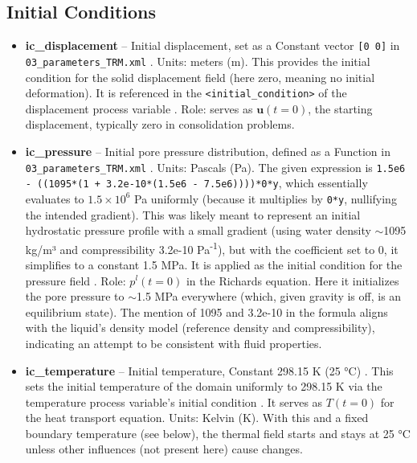 \documentclass[10pt,a4paper]{article}
\begin{document}
\subsection*{Initial Conditions}
\begin{itemize}
    \item \textbf{ic\_displacement} -- Initial displacement, set as a Constant vector \texttt{[0 0]} in \texttt{03\_parameters\_TRM.xml} \cite{file:03_parameters_TRM}. Units: meters (m). This provides the initial condition for the solid displacement field (here zero, meaning no initial deformation). It is referenced in the \texttt{<initial\_condition>} of the displacement process variable \cite{file:02_process_variables_TRM}. Role: serves as $\mathbf{u}(t=0)$, the starting displacement, typically zero in consolidation problems.

    \item \textbf{ic\_pressure} -- Initial pore pressure distribution, defined as a Function in \texttt{03\_parameters\_TRM.xml} \cite{file:03_parameters_TRM}. Units: Pascals (Pa). The given expression is \texttt{1.5e6 - ((1095*(1 + 3.2e-10*(1.5e6 - 7.5e6))))*0*y}, which essentially evaluates to $1.5 \times 10^6$ Pa uniformly (because it multiplies by \texttt{0*y}, nullifying the intended gradient). This was likely meant to represent an initial hydrostatic pressure profile with a small gradient (using water density $\sim$1095 kg/m³ and compressibility 3.2e-10 Pa\textsuperscript{-1}), but with the coefficient set to 0, it simplifies to a constant 1.5 MPa. It is applied as the initial condition for the pressure field \cite{file:02_process_variables_TRM}. Role: $p^l(t=0)$ in the Richards equation. Here it initializes the pore pressure to $\sim$1.5 MPa everywhere (which, given gravity is off, is an equilibrium state). The mention of 1095 and 3.2e-10 in the formula aligns with the liquid's density model (reference density and compressibility), indicating an attempt to be consistent with fluid properties.

    \item \textbf{ic\_temperature} -- Initial temperature, Constant 298.15 K (25 °C) \cite{file:03_parameters_TRM}. This sets the initial temperature of the domain uniformly to 298.15 K via the temperature process variable's initial condition \cite{file:02_process_variables_TRM}. It serves as $T(t=0)$ for the heat transport equation. Units: Kelvin (K). With this and a fixed boundary temperature (see below), the thermal field starts and stays at 25 °C unless other influences (not present here) cause changes.


\end{itemize}
\end{document}
